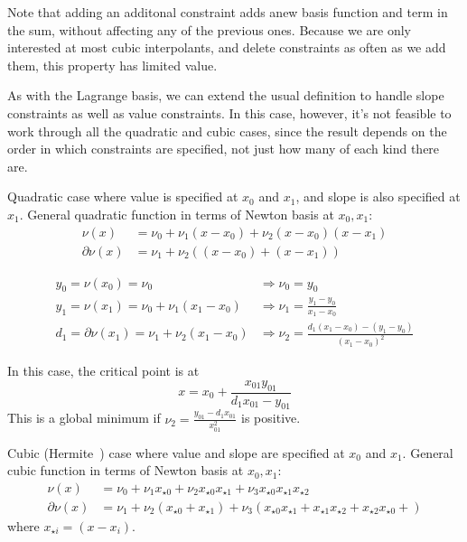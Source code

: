 Note that adding an additonal constraint
adds anew basis function and term in the sum, without affecting 
any of the previous ones.
Because we are only interested at most cubic interpolants,
and delete constraints as often as we add them,
this property has limited value.

As with the Lagrange basis, we can extend the usual definition
to handle slope constraints as well as value constraints.
In this case, however, it's not feasible to work through
all the quadratic and cubic cases, since the result depends
on the order in which constraints are specified, not just
how many of each kind there are.


Quadratic case where value is specified at $x_0$ and $x_1$,
and slope is also specified at $x_1$.
General quadratic function in terms of Newton basis at
$x_0, x_1$:
\begin{align}
\nu(x) & = \nu_0 + \nu_1 (x - x_0) + \nu_2 (x - x_0) (x - x_1) 
\\
\partial{\nu}(x) & = \nu_1 + \nu_2 \left( (x - x_0) + (x - x_1) \right)
\nonumber
\end{align}

\begin{align}
y_0 = \nu(x_0) = \nu_0 & \Rightarrow \nu_0 = y_0 
\\
y_1 = \nu(x_1) = \nu_0 + \nu_1 (x_1 - x_0) & \Rightarrow 
\nu_1 = \frac{y_1-y_0}{x_1 - x_0} 
\nonumber \\
d_1 = \partial{\nu}(x_1) = \nu_1 + \nu_2 (x_1 - x_0) & \Rightarrow 
\nu_2 = \frac{d_1 (x_1 - x_0) - (y_1-y_0)}{(x_1 - x_0)^2} 
\nonumber
\end{align}

In this case, the critical point is at
\begin{equation}
x = x_0 + \frac{x_{01} y_{01}}{d_1 x_{01} - y_{01}}
\end{equation}
This is a global minimum if 
$\nu_2 = \frac{y_{01} - d_1 x_{01}}{x_{01}^2}$
is positive.


Cubic (Hermite~\cite{wiki:Cubic-hermite-spline}) 
case where value and slope are specified at $x_0$ and $x_1$.
General cubic function in terms of Newton basis at
$x_0, x_1$:
\begin{align}
\nu(x) & = \nu_0 + \nu_1 x_{{\star}0} + \nu_2 x_{{\star}0} x_{{\star}1} 
 + \nu_3 x_{{\star}0} x_{{\star}1} x_{{\star}2} \\
\partial{\nu}(x) & = \nu_1 
+ \nu_2 \left( x_{{\star}0} + x_{{\star}1} \right) 
+ \nu_3 \left( 
 x_{{\star}0} x_{{\star}1} +
 x_{{\star}1} x_{{\star}2} +
 x_{{\star}2} x_{{\star}0} +
\right)
\nonumber
\end{align}
where $x_{{\star}i} = \left(x - x_i\right)$.

